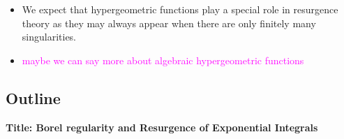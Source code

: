 \documentclass{article}
\theoremstyle{definition}
\begin{document}
\begin{itemize}
\begin{itemize}
\begin{itemize}
\item We expect that hypergeometric functions play a special role in resurgence theory as they may always appear when there are only finitely many singularities.
\item \textcolor{magenta}{maybe we can say more about algebraic hypergeometric functions}
\end{itemize}
\end{itemize}
\end{itemize}

\color{orange}
\subsection*{Outline}

\textbf{Title: Borel regularity and Resurgence of Exponential Integrals}
\end{document}
